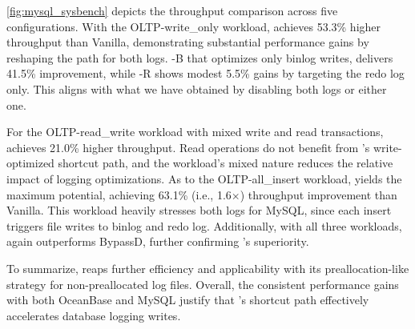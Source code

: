 \autoref{fig:mysql_sysbench} depicts the throughput comparison across five configurations.
With the OLTP-write\_only workload, \odes achieves 53.3\%  higher throughput than  Vanilla, demonstrating substantial performance gains by reshaping the path for both logs. \odes-B that optimizes only binlog writes, delivers 41.5\% improvement, while \odes-R shows modest 5.5\% gains by targeting the redo log only. 
This aligns with what we have obtained by disabling both logs or either one.

For the OLTP-read\_write workload with mixed write and read transactions, \odes achieves 21.0\% higher throughput.
 Read operations do not benefit from \odes's write-optimized shortcut path, and the workload's mixed nature reduces the relative impact of logging optimizations. 
As to  the OLTP-all\_insert workload, \odes yields the maximum potential, achieving 63.1\%
(i.e., 1.6$\times$) throughput improvement than Vanilla. This workload heavily stresses both  logs for MySQL, since each insert triggers file writes to binlog and redo log. 
Additionally, with all three workloads,
\odes again outperforms BypassD,
 further confirming \odes's superiority.

To summarize,
\odes reaps further efficiency and applicability with its preallocation-like strategy for non-preallocated log files.
Overall, the consistent performance gains with both OceanBase and MySQL 
justify that \odes's shortcut path effectively accelerates database logging writes.

